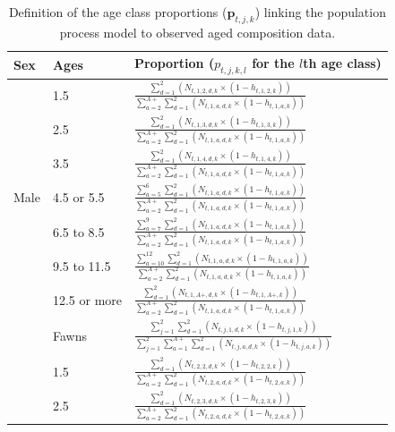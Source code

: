 \documentclass[12pt]{article}\usepackage[]{graphicx}\usepackage[]{color}
\begin{document}
\begin{center}
\begin{table}[H]
\caption{Definition of the age class proportions ($\bm{p}_{t,j,k}$) linking the population process model to observed aged composition data.}
\begin{tabular}{lll}
\centering
  Sex & Ages &Proportion ($p_{t,j,k,l}$ for the $l$th age class)\\
  \toprule
  & 1.5 & $\frac{\sum_{d=1}^2 \left(N_{t,1,2,d,k}\times(1-h_{t,1,2,k})\right)}{\sum_{a=2}^{A+}\sum_{d=1}^2 \left(N_{t,1,a,d,k}\times(1-h_{t,1,a,k})\right)}$\\\midrule
  & 2.5 &  $\frac{\sum_{d=1}^2 \left(N_{t,1,3,d,k}\times(1-h_{t,1,3,k})\right)}{\sum_{a=2}^{A+}\sum_{d=1}^2 \left(N_{t,1,a,d,k}\times(1-h_{t,1,a,k})\right)}$\\\midrule
  & 3.5 & $\frac{\sum_{d=1}^2 \left(N_{t,1,4,d,k}\times(1-h_{t,1,4,k})\right)}{\sum_{a=2}^{A+}\sum_{d=1}^2 \left(N_{t,1,a,d,k}\times(1-h_{t,1,a,k})\right)}$\\\midrule
Male  & 4.5 or 5.5& $\frac{\sum_{a=5}^{6}\sum_{d=1}^2 \left(N_{t,1,a,d,k}\times(1-h_{t,1,a,k})\right)}{\sum_{a=2}^{A+}\sum_{d=1}^2 \left(N_{t,1,a,d,k}\times(1-h_{t,1,a,k})\right)}$\\\midrule
  & 6.5 to 8.5&  $\frac{\sum_{a=7}^{9}\sum_{d=1}^2 \left(N_{t,1,a,d,k}\times(1-h_{t,1,a,k})\right)}{\sum_{a=2}^{A+}\sum_{d=1}^2 \left(N_{t,1,a,d,k}\times(1-h_{t,1,a,k})\right)}$\\\midrule
  & 9.5 to 11.5 & $\frac{\sum_{a=10}^{12}\sum_{d=1}^2 \left(N_{t,1,a,d,k}\times(1-h_{t,1,a,k})\right)}{\sum_{a=2}^{A+}\sum_{d=1}^2 \left(N_{t,1,a,d,k}\times(1-h_{t,1,a,k})\right)}$\\\midrule
  & 12.5 or more& $\frac{\sum_{d=1}^2 \left(N_{t,1,A+,d,k}\times(1-h_{t,1,A+,k})\right)}{\sum_{a=2}^{A+}\sum_{d=1}^2 \left(N_{t,1,a,d,k}\times(1-h_{t,1,a,k})\right)}$\\
\midrule\midrule
  & Fawns & $\frac{\sum_{j=1}^2\sum_{d=1}^2 \left(N_{t,j,1,d,k}\times(1-h_{t,j,1,k})\right)}{\sum_{j=1}^2\sum_{a=1}^{A+}\sum_{d=1}^2 \left(N_{t,j,a,d,k}\times(1-h_{t,j,a,k})\right)}$\\\midrule
  & 1.5 & $\frac{\sum_{d=1}^2 \left(N_{t,2,2,d,k}\times(1-h_{t,2,2,k})\right)}{\sum_{a=2}^{A+}\sum_{d=1}^2 \left(N_{t,2,a,d,k}\times(1-h_{t,2,a,k})\right)}$\\\midrule
  & 2.5 &  $\frac{\sum_{d=1}^2 \left(N_{t,2,3,d,k}\times(1-h_{t,2,3,k})\right)}{\sum_{a=2}^{A+}\sum_{d=1}^2 \left(N_{t,2,a,d,k}\times(1-h_{t,2,a,k})\right)}$\\\midrule

\end{tabular}
\end{table}
\end{center}
\end{document}
